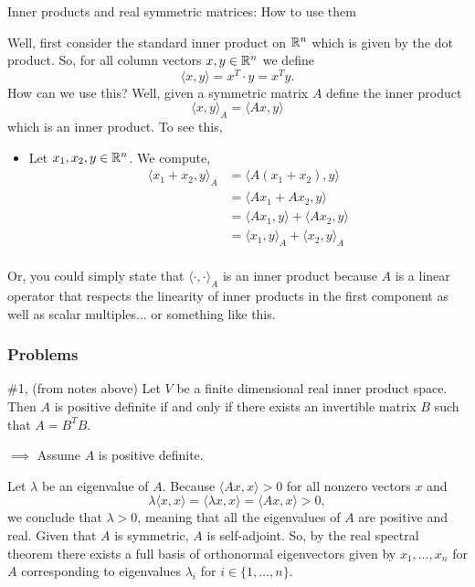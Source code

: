 \documentclass{article}
\begin{document}
Inner products and real symmetric matrices: How to use them

Well, first consider the standard inner product on $\mathbb R^n$ which is given by the dot product. So, for all column vectors $x,y\in\mathbb R^n$ we define
	\[\langle x, y\rangle = x^T\cdot y = x^Ty.\]
How can we use this? Well, given a symmetric matrix $A$ define the inner product 
	\[\langle x, y\rangle_A = \langle Ax, y\rangle \]
which is an inner product. To see this, 
	\begin{itemize}
		\item Let $x_1, x_2, y\in \mathbb R^n$. We compute, 
			\begin{align*}	\langle x_1 + x_2, y \rangle_A 
							& = \langle A(x_1 + x_2), y \rangle\\
							& = \langle Ax_1 + Ax_2, y \rangle\\
							& = \langle Ax_1, y\rangle + \langle Ax_2, y \rangle\\
							& = \langle x_1, y\rangle_A + \langle x_2, y \rangle_A\\
			\end{align*}
	\end{itemize}
Or, you could simply state that $\langle \cdot, \cdot \rangle_A$ is an inner product because $A$ is a linear operator that respects the linearity of inner products in the first component as well as scalar multiples... or something like this.
\break
	
\subsubsection{Problems}

\begin{problem}{\#1, (from notes above)} Let $V$ be a finite dimensional real inner product space. Then $A$ is positive definite if and only if there exists an invertible matrix $B$ such that $A = B^T B$.
\end{problem}

$\implies$ Assume $A$ is positive definite. 

Let $\lambda$ be an eigenvalue of $A$. Because $\langle Ax, x\rangle > 0$ for all nonzero vectors $x$ and
\[ \lambda\langle x, x \rangle = \langle \lambda x, x\rangle = \langle Ax, x\rangle > 0,\]
we conclude that $\lambda >0$, meaning that all the eigenvalues of $A$ are positive and real. Given that $A$ is symmetric, $A$ is self-adjoint. So, by the real spectral theorem there exists a full basis of orthonormal eigenvectors given by $x_1, \dots, x_n$ for $A$ corresponding to eigenvalues $\lambda_i$ for $i\in \{1, \dots, n\}$.
\end{document}
